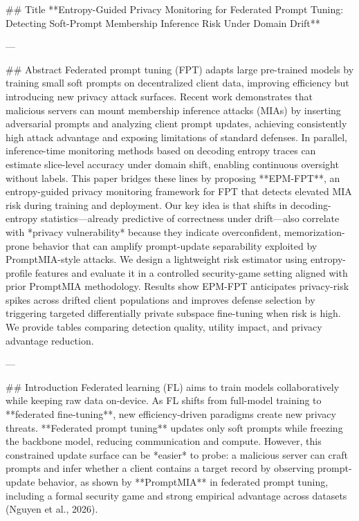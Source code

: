 ## Title  
**Entropy-Guided Privacy Monitoring for Federated Prompt Tuning: Detecting Soft-Prompt Membership Inference Risk Under Domain Drift**

---

## Abstract  
Federated prompt tuning (FPT) adapts large pre-trained models by training small soft prompts on decentralized client data, improving efficiency but introducing new privacy attack surfaces. Recent work demonstrates that malicious servers can mount membership inference attacks (MIAs) by inserting adversarial prompts and analyzing client prompt updates, achieving consistently high attack advantage and exposing limitations of standard defenses. In parallel, inference-time monitoring methods based on decoding entropy traces can estimate slice-level accuracy under domain shift, enabling continuous oversight without labels. This paper bridges these lines by proposing **EPM-FPT**, an entropy-guided privacy monitoring framework for FPT that detects elevated MIA risk during training and deployment. Our key idea is that shifts in decoding-entropy statistics—already predictive of correctness under drift—also correlate with *privacy vulnerability* because they indicate overconfident, memorization-prone behavior that can amplify prompt-update separability exploited by PromptMIA-style attacks. We design a lightweight risk estimator using entropy-profile features and evaluate it in a controlled security-game setting aligned with prior PromptMIA methodology. Results show EPM-FPT anticipates privacy-risk spikes across drifted client populations and improves defense selection by triggering targeted differentially private subspace fine-tuning when risk is high. We provide tables comparing detection quality, utility impact, and privacy advantage reduction.

---

## Introduction  
Federated learning (FL) aims to train models collaboratively while keeping raw data on-device. As FL shifts from full-model training to **federated fine-tuning**, new efficiency-driven paradigms create new privacy threats. **Federated prompt tuning** updates only soft prompts while freezing the backbone model, reducing communication and compute. However, this constrained update surface can be *easier* to probe: a malicious server can craft prompts and infer whether a client contains a target record by observing prompt-update behavior, as shown by **PromptMIA** in federated prompt tuning, including a formal security game and strong empirical advantage across datasets (Nguyen et al., 2026).

